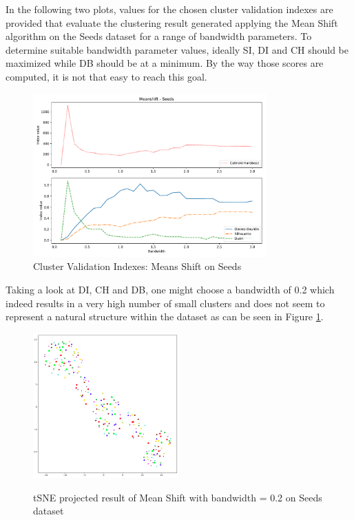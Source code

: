 In the following two plots, values for the chosen cluster validation indexes are provided that evaluate the clustering result generated applying the Mean Shift algorithm on the Seeds dataset for a range of bandwidth parameters.
To determine suitable bandwidth parameter values, ideally SI, DI and CH should be maximized while DB should be at a minimum. 
By the way those scores are computed, it is not that easy to reach this goal.
\newline
\begin{figure}[!ht]
\caption{Cluster Validation Indexes: Means Shift on Seeds}
\begin{center}
\includegraphics[width=0.8\textwidth]{images/Meanshift_-_Seeds.pdf}
\end{center}
\end{figure}
Taking a look at DI, CH and DB, one might choose a bandwidth of 0.2 which indeed results in a very high number of small clusters and does not seem to represent a natural structure within the dataset as can be seen in Figure \ref{fig:meanshift_seeds_tsne}.
\begin{figure}[!ht]
    \centering
    \includegraphics[width=0.5\textwidth]{images/Meanshift_Seeds_0_2.png}
    \label{fig:meanshift_seeds_tsne}
    \caption{tSNE projected result of Mean Shift with bandwidth = 0.2 on Seeds dataset}
\end{figure}
